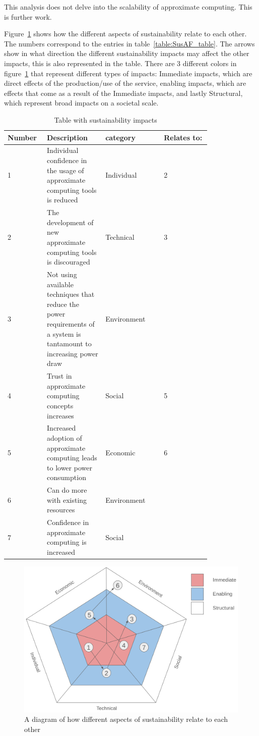 This analysis does not delve into the scalability of approximate computing. This is further work.


Figure~\ref{fig:SusAF_diagram} shows how the different aspects of sustainability relate to each other. The numbers correspond to the entries in table~\ref{table:SusAF_table}. The arrows show in what direction the different sustainability impacts may affect the other impacts, this is also represented in the table.
There are 3 different colors in figure~\ref{fig:SusAF_diagram} that represent different types of impacts: Immediate impacts, which are direct effects of the production/use of the service, enabling impacts, which are effects that come as a result of the Immediate impacts, and lastly Structural, which represent broad impacts on a societal scale.
\begin{table}[]
    \centering
    \begin{tabular}{p{0.1\linewidth}|p{0.25\linewidth}|p{0.25\linewidth}|p{0.2\linewidth}} 
        Number & Description & category & Relates to: \\
        \hline
         1 & Individual confidence in the usage of approximate computing tools is reduced & Individual & 2 \\
         2 & The development of new approximate computing tools is discouraged & Technical & 3\\
         3 & Not using available techniques that reduce the power requirements of a system is tantamount to increasing power draw & Environment && \\
         4 & Trust in approximate computing concepts increases & Social &  5 \\
         5 & Increased adoption of approximate computing leads to lower power consumption & Economic &6 \\    
         6 & Can do more with existing resources & Environment & &\\
         7 & Confidence in approximate computing is increased& Social&  \\
    \end{tabular}
    \caption{Table with sustainability impacts}
    \label{tab:my_label}
\end{table}


\begin{figure}
    \centering
    \includegraphics[width=0.5\linewidth]{Images/SusAF_diagram.png}
    \caption{A diagram of how different aspects of sustainability relate to each other}
    \label{fig:SusAF_diagram}
\end{figure}